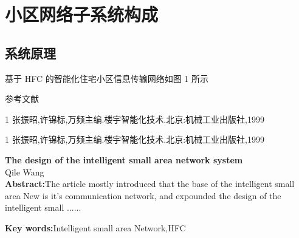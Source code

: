 \documentclass[openright, twoside]{gdutthesis-excellent}
\begin{document}
\chapter{小区网络子系统构成}
\section{系统原理}
基于 HFC 的智能化住宅小区信息传输网络如图 1 所示\par

\setlength{\baselineskip}{10pt}
\renewcommand{\baselinestretch}{1}
\begin{center}
\heiticu 参考文献
\end{center}

\renewcommand{\baselinestretch}{1.2}
\kaishu
\setlength{\parindent}{0em}
1 张振昭,许锦标,万频主编.楼宇智能化技术.北京:机械工业出版社,1999\par
1 张振昭,许锦标,万频主编.楼宇智能化技术.北京:机械工业出版社,1999\par

\vspace{36pt}

\renewcommand{\baselinestretch}{1}
{
\centering
{}\textbf{The design of the intelligent small area network system}\\
 Qile Wang\\
}
\textbf{Abstract:}The article mostly introduced that the base of the intelligent small area New is it's communication network, and expounded the design of the intelligent small ......\par
\textbf{Key words:}Intelligent small area Network,HFC\par
\end{document}
